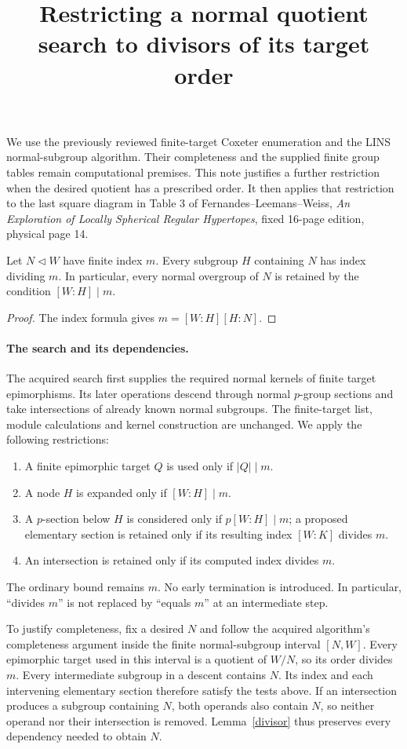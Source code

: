 \documentclass[11pt]{article}
\title{Restricting a normal quotient search to divisors of its target order}
\author{}\date{}
\begin{document}
\maketitle
We use the previously reviewed finite-target Coxeter enumeration and the
LINS normal-subgroup algorithm. Their completeness and the supplied finite
group tables remain computational premises. This note justifies a further
restriction when the desired quotient has a prescribed order. It then
applies that restriction to the last square diagram in Table 3 of
Fernandes--Leemans--Weiss, \emph{An Exploration of Locally Spherical
Regular Hypertopes}, fixed 16-page edition, physical page 14.

\begin{lemma}\label{divisor}
Let $N\lhd W$ have finite index $m$. Every subgroup $H$ containing $N$
has index dividing $m$. In particular, every normal overgroup of $N$ is
retained by the condition $[W:H]\mid m$.
\end{lemma}
\begin{proof}
The index formula gives $m=[W:H][H:N]$.
\end{proof}

\paragraph{The search and its dependencies.}
The acquired search first supplies the required normal kernels of finite
target epimorphisms. Its later operations descend through normal
$p$-group sections and take intersections of already known normal
subgroups. The finite-target list, module calculations and kernel
construction are unchanged. We apply the following restrictions:
\begin{enumerate}
\item A finite epimorphic target $Q$ is used only if $|Q|\mid m$.
\item A node $H$ is expanded only if $[W:H]\mid m$.
\item A $p$-section below $H$ is considered only if $p[W:H]\mid m$;
      a proposed elementary section is retained only if its resulting
      index $[W:K]$ divides $m$.
\item An intersection is retained only if its computed index divides $m$.
\end{enumerate}
The ordinary bound remains $m$. No early termination is introduced.
In particular, ``divides $m$'' is not replaced by ``equals $m$'' at an
intermediate step.

To justify completeness, fix a desired $N$ and follow the acquired
algorithm's completeness argument inside the finite normal-subgroup
interval $[N,W]$. Every epimorphic target used in this interval is a
quotient of $W/N$, so its order divides $m$. Every intermediate subgroup
in a descent contains $N$. Its index and each intervening elementary
section therefore satisfy the tests above. If an intersection produces
a subgroup containing $N$, both operands also contain $N$, so neither
operand nor their intersection is removed. Lemma~\ref{divisor} thus
preserves every dependency needed to obtain $N$.
\end{document}
